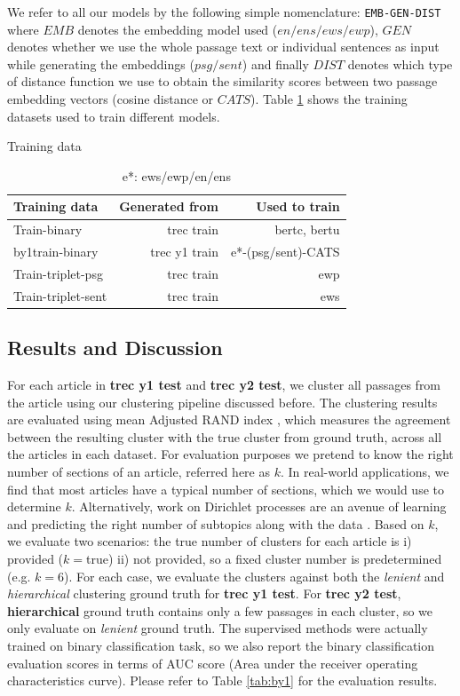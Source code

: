We refer to all our models by the following simple nomenclature: \texttt{EMB-GEN-DIST} where $EMB$ denotes the embedding model used ($en/ens/ews/ewp$), $GEN$ denotes whether we use the whole passage text or individual sentences as input while generating the embeddings ($psg/sent$) and finally $DIST$ denotes which type of distance function we use to obtain the similarity scores between two passage embedding vectors (cosine distance or $CATS$). Table \ref{tab:dat} shows the training datasets used to train different models.

\begin{table}[t]
\centering
\caption{Training data}
\label{tab:dat}
\begin{tabular}{@{}lrr@{}}\toprule
Training data & Generated from & Used to train \\\midrule
Train-binary & trec train & bertc, bertu \\
by1train-binary & trec y1 train & e*-(psg/sent)-CATS \\
Train-triplet-psg & trec train & ewp \\
Train-triplet-sent & trec train & ews \\
\bottomrule
\end{tabular}
\caption*{e*: ews/ewp/en/ens \\}
\end{table}

\subsection{Results and Discussion} For each article in \textbf{trec y1 test} and \textbf{trec y2 test}, we cluster all passages from the article using our clustering pipeline discussed before. The clustering results are evaluated using mean Adjusted RAND index \cite{hubert1985comparing}, which measures the agreement between the resulting cluster with the true cluster from ground truth, across all the articles in each dataset. For evaluation purposes we pretend to know the right number of sections of an article, referred here as $k$. In real-world applications, we find that most articles have a typical number of sections, which we would use to determine $k$. Alternatively, work on Dirichlet processes are an avenue of learning and predicting the right number of subtopics along with the data \cite{griffiths2004hierarchical, blei2011distance}. Based on $k$, we evaluate two scenarios: the true number of clusters for each article is i) provided ($k=$true) ii) not provided, so a fixed cluster number is predetermined (e.g. $k=$6). For each case, we evaluate the clusters against both the \textit{lenient} and \textit{hierarchical} clustering ground truth for \textbf{trec y1 test}. For \textbf{trec y2 test}, \textbf{hierarchical} ground truth contains only a few passages in each cluster, so we only evaluate on \textit{lenient} ground truth. The supervised methods were actually trained on binary classification task, so we also report the binary classification evaluation scores in terms of AUC score (Area under the receiver operating characteristics curve). Please refer to Table \ref{tab:by1} for the evaluation results.


